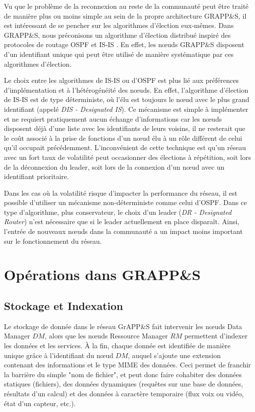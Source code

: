 Vu que le problème de la reconnexion au reste de la communauté peut être traité de manière plus ou moins simple au sein de la propre architecture GRAPP\&S, il est intéressant de se pencher sur les algorithmes d'élection eux-mêmes. Dans GRAPP\&S, nous préconisons un algorithme d'élection distribué inspiré des protocoles de routage OSPF et IS-IS \cite{rfc1142,rfc2328,ISISxOSPF}. En effet, les n{\oe}uds GRAPP\&S disposent d'un identifiant unique qui peut être utilisé de manière systématique par ces algorithmes d'élection. 

Le choix entre les algorithmes de IS-IS ou d'OSPF est plus lié aux préférences d'implémentation et à l'hétérogénéité des n{\oe}uds. En effet, l'algorithme d'élection de IS-IS est de type déterministe, où l'élu est toujours le n{\oe}ud avec le plus grand identifiant (appelé \textit{DIS - Designated IS}). Ce mécanisme est simple à implémenter et ne requiert pratiquement aucun échange d'informations car les n{\oe}uds disposent déjà d'une liste avec les identifiants de leurs voisins, il ne resterait que le coût associé à la prise de fonctions d'un n{\oe}ud élu à un rôle différent de celui qu'il occupait précédemment. L'inconvénient de cette technique est qu'un réseau avec un fort taux de volatilité peut occasionner des élections à répétition, soit lors de la déconnexion du leader, soit lors de la connexion d'un n{\oe}ud avec un identifiant prioritaire.

Dans les cas où la volatilité risque d'impacter la performance du réseau, il est possible d'utiliser un mécanisme non-déterministe comme celui d'OSPF. Dans ce type d'algorithme, plus conservateur, le choix d'un leader (\textit{DR - Designated Router}) n'est nécessaire que si le leader actuellement en place disparaît. Ainsi, l'entrée de nouveaux n{\oe}uds dans la communauté a un impact moins important sur le fonctionnement du réseau.

 \section{Opérations dans GRAPP\&S\label{SEC:OPERATIONS}}

\subsection{Stockage et Indexation}

Le stockage de donnée dans le réseau GrAPP\&S fait intervenir les n{\oe}uds Data Manager $DM$, alors que les n{\oe}uds Ressource Manager $RM$ permettent d'indexer les données et les services. À la fin, chaque donnée est identifiée de manière unique grâce à l'identifiant du n{\oe}ud $DM$, auquel s'ajoute une extension contenant des informations et le type MIME des données. Ceci permet de franchir la barrière du simple "nom de fichier", et peut donc faire cohabiter des données statiques (fichiers), des données dynamiques (requêtes sur une base de données, résultats d'un calcul) et des données à caractère temporaire (flux voix ou vidéo, état d'un capteur, etc.). 

